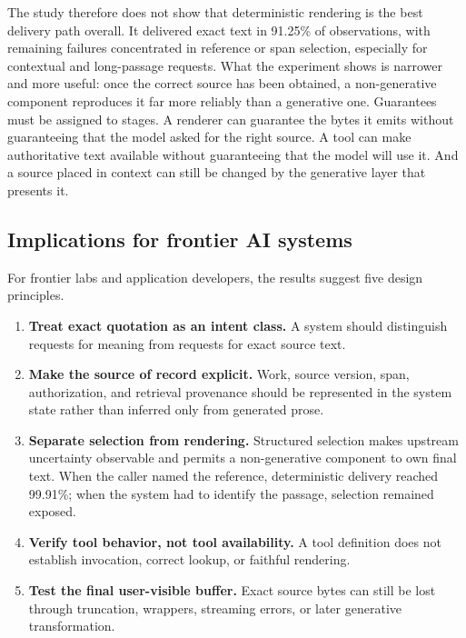 \documentclass[11pt]{article}
\begin{document}
The study therefore does not show that deterministic rendering is the best
delivery path overall. It delivered exact text in 91.25\% of observations, with
remaining failures concentrated in reference or span selection, especially for
contextual and long-passage requests. What
the experiment shows is narrower and more useful: once the correct source has
been obtained, a non-generative component reproduces it far more reliably than
a generative one. Guarantees must be assigned to stages. A renderer can guarantee the bytes it emits without guaranteeing
that the model asked for the right source. A tool can make authoritative text
available without guaranteeing that the model will use it. And a source placed
in context can still be changed by the generative layer that presents it.

\subsection{Implications for frontier AI systems}

For frontier labs and application developers, the results suggest five design
principles.

\begin{enumerate}[leftmargin=*,topsep=4pt,itemsep=2pt]
  \item \textbf{Treat exact quotation as an intent class.} A system should
        distinguish requests for meaning from requests for exact source text.
  \item \textbf{Make the source of record explicit.} Work, source version, span,
        authorization, and retrieval provenance should be represented in the
        system state rather than inferred only from generated prose.
  \item \textbf{Separate selection from rendering.} Structured selection makes
        upstream uncertainty observable and permits a non-generative component
        to own final text. When the caller named the reference, deterministic
        delivery reached 99.91\%; when the system had to identify the passage,
        selection remained exposed.
  \item \textbf{Verify tool behavior, not tool availability.} A tool definition
        does not establish invocation, correct lookup, or faithful rendering.
  \item \textbf{Test the final user-visible buffer.} Exact source bytes can
        still be lost through truncation, wrappers, streaming errors, or later
        generative transformation.
\end{enumerate}
\end{document}

